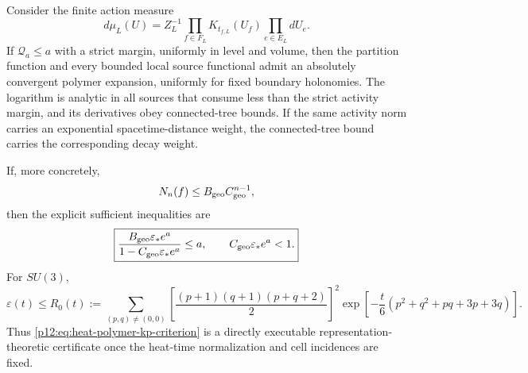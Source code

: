 \documentclass[12pt,a4paper]{article}
\begin{document}
\begin{theorem}
\label{p12:thm:source-stable-heat-polymer-domain}
Consider the finite action measure
\[
 d\mu_L(U)=Z_L^{-1}
 \prod_{f\in F_L}K_{t_{f,L}}(U_f)
 \prod_{e\in E_L}dU_e.
\]
If $\mathcal Q_a\le a$ with a strict margin, uniformly in level and volume,
then the partition function and every bounded local source functional admit
an absolutely convergent polymer expansion, uniformly for fixed boundary
holonomies.  The logarithm is analytic in all sources that consume less than
the strict activity margin, and its derivatives obey connected-tree bounds.
If the same activity norm carries an exponential spacetime-distance weight,
the connected-tree bound carries the corresponding decay weight.

If, more concretely,
\begin{equation}
\label{p12:eq:heat-polymer-geometric-count}
 N_n(f)\le B_{\rm geo}C_{\rm geo}^{n-1},
\end{equation}
then the explicit sufficient inequalities are
\begin{equation}
\label{p12:eq:heat-polymer-kp-criterion}
 \boxed{
 \frac{B_{\rm geo}\varepsilon_*e^a}
 {1-C_{\rm geo}\varepsilon_*e^a}\le a,
 \qquad
 C_{\rm geo}\varepsilon_*e^a<1.}
\end{equation}
For $SU(3)$,
\begin{equation}
\label{p12:eq:su3-heat-character-majorant}
 \varepsilon(t)
 \le R_0(t)
 :=\sum_{(p,q)\ne(0,0)}
 \left[\frac{(p+1)(q+1)(p+q+2)}2\right]^2
 \exp\!\left[-\frac t6
 (p^2+q^2+pq+3p+3q)\right].
\end{equation}
Thus \eqref{p12:eq:heat-polymer-kp-criterion} is a directly executable
representation-theoretic certificate once the heat-time normalization and
cell incidences are fixed.
\end{theorem}
\end{document}
